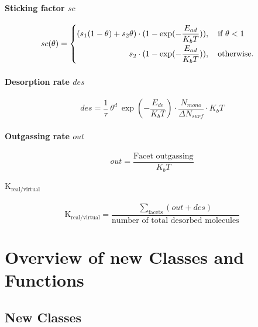 \subsubsection*{Sticking factor $sc$}
\begin{equation}
	\label{eq:sc}
	sc(\theta)=
	\begin{cases}
		\begin{split}
		(s_1 (1-\theta) + s_2 \theta) \cdot (1 -  \exp({-\frac{E_{ad}}{K_b T}}))&, \text{\quad if}\ \theta < 1\\
		s_2  \cdot (1 -  \exp({-\frac{E_{ad}}{K_b T}}))&,  \text{\quad otherwise}.
		\end{split}
	\end{cases}
\end{equation}

\subsubsection*{Desorption rate $des$}
\begin{equation}
	\label{eq:des}
	des=\frac{1}{\tau}\ \theta^d\ \exp({-\frac{E_{de}}{K_b T}})\cdot \frac{N_{mono}}{\Delta N_{surf}} \cdot K_b T
\end{equation}

\subsubsection*{Outgassing rate $out$}
\begin{equation}
	\label{eq:out}
	out=\frac{\text{Facet outgassing}}{K_b T}
\end{equation}

\subsubsection*{$\text{K}_{\text{real}/\text{virtual}}$}
\begin{equation}
	\label{eq:krealvirt}
	\text{K}_{\text{real}/\text{virtual}}=\frac{\sum\limits_{\text{facets}}(out + des)}{\text{number of total desorbed molecules}}
\end{equation}

\chapter{Overview of new Classes and Functions}
\section{New Classes}


